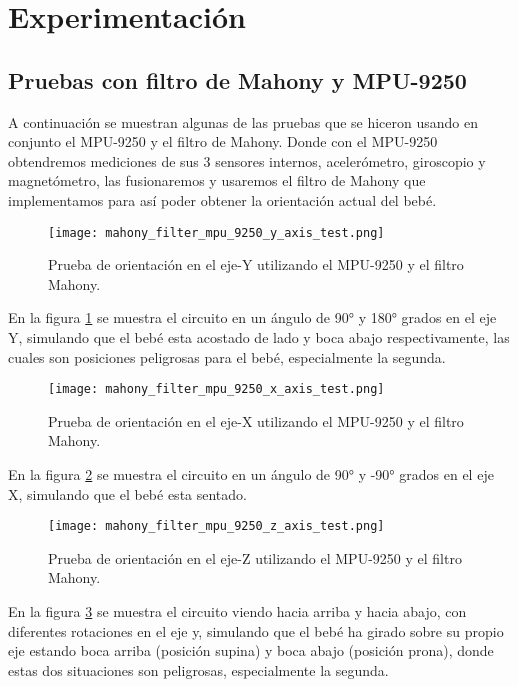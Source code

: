 



\section{Experimentación}
\subsection{Pruebas con filtro de Mahony y MPU-9250}
A continuación se muestran algunas de las pruebas que se hiceron usando en conjunto el
MPU-9250 y el filtro de Mahony. Donde con el MPU-9250 obtendremos mediciones de sus 3 sensores internos, acelerómetro,
giroscopio y magnetómetro, las fusionaremos y usaremos el filtro de Mahony que
implementamos para así poder obtener la orientación actual del bebé.

\begin{figure}[htp!]
    \centering
    \texttt{[image: mahony\_filter\_mpu\_9250\_y\_axis\_test.png]}
    \caption{Prueba de orientación en el eje-Y utilizando el MPU-9250 y el filtro Mahony.}
    \label{fig: test-y}
\end{figure}
\FloatBarrier

En la figura \ref{fig: test-y} se muestra el circuito en un ángulo de 90° y 180° grados en el eje Y, simulando que el bebé
esta acostado de lado y boca abajo respectivamente, las cuales son posiciones peligrosas para el bebé, especialmente
la segunda.

\begin{figure}[htp!]
    \centering
    \texttt{[image: mahony\_filter\_mpu\_9250\_x\_axis\_test.png]}
    \caption{Prueba de orientación en el eje-X utilizando el MPU-9250 y el filtro Mahony.}
    \label{fig: test-x}
\end{figure}
\FloatBarrier

En la figura \ref{fig: test-x} se muestra el circuito en un ángulo de 90° y -90° grados en el eje X, simulando que el bebé
esta sentado.

\begin{figure}[htp!]
    \centering
    \texttt{[image: mahony\_filter\_mpu\_9250\_z\_axis\_test.png]}
    \caption{Prueba de orientación en el eje-Z utilizando el MPU-9250 y el filtro Mahony.}
    \label{fig: test-z}
\end{figure}
\FloatBarrier

En la figura \ref{fig: test-z} se muestra el circuito viendo hacia arriba y hacia abajo, con diferentes rotaciones en el eje y,
simulando que el bebé ha girado sobre su propio eje estando boca arriba (posición supina) y boca abajo (posición prona), donde estas
dos situaciones son peligrosas, especialmente la segunda.\newline


